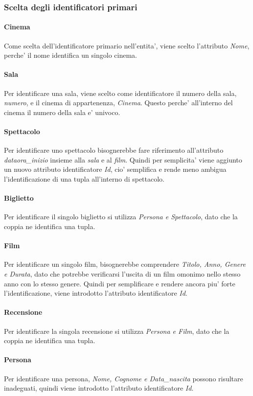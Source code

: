 \documentclass[10pt]{article}
\begin{document}
	\subsubsection{Scelta degli identificatori primari}
	\paragraph{Cinema}
	Come scelta dell'identificatore primario nell'entita', viene scelto l'attributo \textit{Nome}, perche' il nome identifica un singolo cinema.
	\paragraph{Sala}
	Per identificare una sala, viene scelto come identificatore il numero della sala, \textit{numero}, e il cinema di appartenenza, \textit{Cinema}. Questo perche' all'interno del cinema il numero della sala e' univoco.
	\paragraph{Spettacolo}
	Per identificare uno spettacolo bisognerebbe fare riferimento all'attributo \textit{dataora\_inizio} insieme alla \textit{sala} e al \textit{film}. Quindi per semplicita' viene aggiunto un nuovo attributo identificatore \textit{Id}, cio' semplifica e rende meno ambigua l'identificazione di una tupla all'interno di spettacolo.
	\paragraph{Biglietto}
	Per identificare il singolo biglietto si utilizza \textit{Persona e Spettacolo}, dato che la coppia ne identifica una tupla.
	\paragraph{Film}
	Per identificare un singolo film, bisognerebbe comprendere \textit{Titolo, Anno, Genere e Durata}, dato che potrebbe verificarsi l'uscita di un film omonimo nello stesso anno con lo stesso genere. Quindi per semplificare e rendere ancora piu' forte l'identificazione, viene introdotto l'attributo identificatore \textit{Id}.
	\paragraph{Recensione}
	Per identificare la singola recensione si utilizza \textit{Persona e Film}, dato che la coppia ne identifica una tupla.
	\paragraph{Persona}
	Per identificare una persona, \textit{Nome, Cognome e Data\_nascita} possono risultare inadeguati, quindi viene introdotto l'attributo identificatore \textit{Id}.
\end{document}
